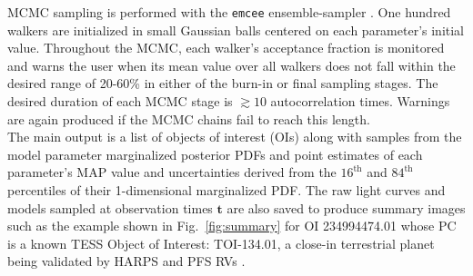 MCMC sampling is performed with the \texttt{emcee}
ensemble-sampler \citep{foremanmackey13}. One hundred walkers are initialized in small Gaussian balls
centered on each parameter's initial value. Throughout the MCMC, each walker's acceptance
fraction is monitored and warns the user when its mean value over all walkers does not
fall within the desired range of 20-60\% in either of the burn-in or final sampling stages.
The desired duration of each MCMC stage is $\gtrsim 10$ autocorrelation times. Warnings are again produced
if the MCMC chains fail to reach this length. \\

The main \pipeline{} output is a list of objects of interest (OIs)
along with samples from the model parameter marginalized
posterior PDFs and point estimates of each parameter's MAP value and uncertainties derived from the
$16^{\text{th}}$ and $84^{\text{th}}$ percentiles of their 1-dimensional marginalized PDF.
The raw light curves and models
sampled at observation times $\mathbf{t}$ are also saved to produce summary images 
such as the example shown in Fig.~\ref{fig:summary} for OI 234994474.01  
whose PC is a known TESS Object of Interest: TOI-134.01, a close-in terrestrial planet being validated
by HARPS and PFS RVs \citep{astudillodefru19}.


